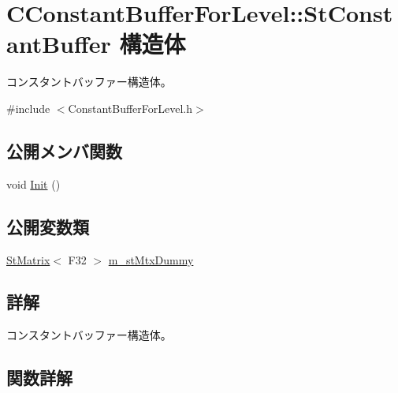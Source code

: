 \hypertarget{struct_c_constant_buffer_for_level_1_1_st_constant_buffer}{}\section{C\+Constant\+Buffer\+For\+Level\+:\+:St\+Constant\+Buffer 構造体}
\label{struct_c_constant_buffer_for_level_1_1_st_constant_buffer}


コンスタントバッファー構造体。  




{\ttfamily \#include $<$Constant\+Buffer\+For\+Level.\+h$>$}

\subsection*{公開メンバ関数}
\begin{DoxyCompactItemize}
\item 
void \hyperlink{struct_c_constant_buffer_for_level_1_1_st_constant_buffer_ac4cf0fbf8e8fa5b757ba3176c97c29a4}{Init} ()
\end{DoxyCompactItemize}
\subsection*{公開変数類}
\begin{DoxyCompactItemize}
\item 
\hyperlink{struct_st_matrix}{St\+Matrix}$<$ F32 $>$ \hyperlink{struct_c_constant_buffer_for_level_1_1_st_constant_buffer_a0f47f708a3588edd70482c2517a80457}{m\+\_\+st\+Mtx\+Dummy}
\end{DoxyCompactItemize}


\subsection{詳解}
コンスタントバッファー構造体。 

\subsection{関数詳解}
\hypertarget{struct_c_constant_buffer_for_level_1_1_st_constant_buffer_ac4cf0fbf8e8fa5b757ba3176c97c29a4}{}
